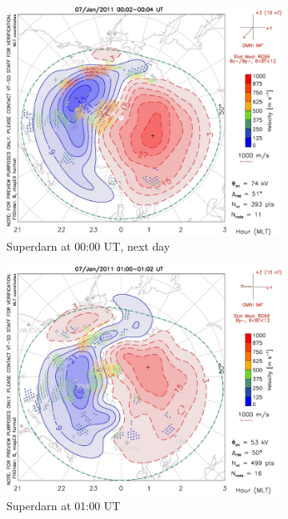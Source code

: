 \documentclass[10pt,a4paper]{article}
\begin{document}
\begin{figure}
\begin{subfigure}{0.3\textwidth}
	\includegraphics[width=\textwidth]{Superdarn7.jpg}
	\caption{ Superdarn at 00:00 UT, next day \label{Super_00}}
\end{subfigure}
\begin{subfigure}{0.3\textwidth}
\centering
	\includegraphics[width=\textwidth]{Superdarn8.jpg}
	\caption{ Superdarn at 01:00 UT \label{Super_01}}
\end{subfigure}
\begin{subfigure}{0.3\textwidth}
\centering

\end{subfigure}
\end{figure}
\end{document}
